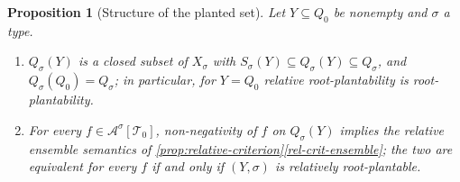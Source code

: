 \documentclass[11pt]{article}
\newtheorem{proposition}[proposition]{Proposition}
\theoremstyle{definition}
\newcommand{\A}{\mathcal{A}}
\newcommand{\T}{\mathcal{T}}
\begin{document}
\begin{proposition}[Structure of the planted set]\label{prop:relative-plantability}
Let $Y\subseteq Q_0$ be nonempty and $\sigma$ a type.
\begin{enumerate}[label=\textup{(\roman*)}, leftmargin=2.5em]
  \item\label{rp-basic} $Q_\sigma(Y)$ is a closed subset of $X_\sigma$ with
  $S_\sigma(Y)\subseteq Q_\sigma(Y)\subseteq Q_\sigma$, and $Q_\sigma(Q_0)=Q_\sigma$;
  in particular, for $Y=Q_0$ relative root-plantability is root-plantability.
  \item\label{rp-criterion} For every $f\in\A^\sigma[\T_0]$, non-negativity of $f$ on
  $Q_\sigma(Y)$ implies the relative ensemble semantics of
  \cref{prop:relative-criterion}\ref{rel-crit-ensemble}; the two are equivalent for
  every $f$ if and only if $(Y,\sigma)$ is relatively root-plantable.
\end{enumerate}
\end{proposition}
\end{document}

